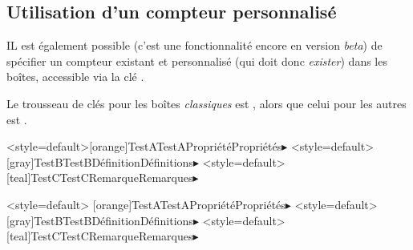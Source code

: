 \documentclass[french,11pt,a4paper]{article}
\begin{document}
\pagebreak

\subsection{Utilisation d'un compteur personnalisé}

IL est également possible (c'est une fonctionnalité encore en version \textit{beta}) de spécifier un \textsf{compteur} existant et personnalisé (qui doit donc \textit{exister}) dans les boîtes, accessible via la clé \MontreCode{[CompteurPerso=...]}.

\smallskip

Le trousseau de clés pour les boîtes \textit{classiques} est \MontreCode{[Boites]}, alors que celui pour les autres est \MontreCode{[cpaltboites]}.

\GenereBoite<style=default>[orange]{TestA}{TestA}{Propriété}{Propriétés}{$\blacktriangleright$}
\GenereBoite<style=default>[gray]{TestB}{TestB}{Définition}{Définitions}{$\blacktriangleright$}
\GenereBoite<style=default>[teal]{TestC}{TestC}{Remarque}{Remarques}{$\blacktriangleright$}

\begin{codehigh}[language=latex/latex2,style/main=cyan!10,style/code=cyan!10]
\GenereBoite<style=default>%
  [orange]{TestA}{TestA}{Propriété}{Propriétés}{$\blacktriangleright$}
\GenereBoite<style=default>%
  [gray]{TestB}{TestB}{Définition}{Définitions}{$\blacktriangleright$}
\GenereBoite<style=default>%
  [teal]{TestC}{TestC}{Remarque}{Remarques}{$\blacktriangleright$}
\end{codehigh}

\begin{demohigh}[language=latex/latex2,style/main=cyan!10,style/code=cyan!10]
\begin{TestA}
\lipsum[1][3-4]
\end{TestA}
\begin{TestB}
\lipsum[2][3-4]
\end{TestB}
\begin{TestC}
\lipsum[2][3-4]
\end{TestC}
\begin{TestB}
\lipsum[2][3-4]
\end{TestB}
\begin{TestC}[Pluriel,Logo={example-image-1x1},SousTitre={ - Fondamentales -}]
\lipsum[3][1-7]
\end{TestC}
\end{demohigh}
\end{document}

